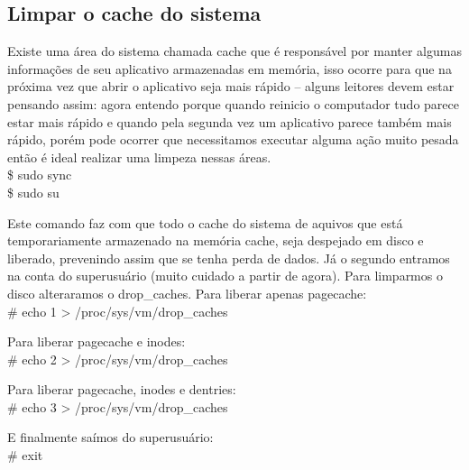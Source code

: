 \subsection{Limpar o cache do sistema}
Existe uma área do sistema chamada cache que é responsável por manter algumas informações de seu aplicativo armazenadas em memória, isso ocorre para que na próxima vez que abrir o aplicativo seja mais rápido – alguns leitores devem estar pensando assim: agora entendo porque quando reinicio o computador tudo parece estar mais rápido e quando pela segunda vez um aplicativo parece também mais rápido, porém pode ocorrer que necessitamos executar alguma ação muito pesada então é ideal realizar uma limpeza nessas áreas. \\
{\ttfamily\$ sudo sync \\
\$ sudo su}

Este comando faz com que todo o cache do sistema de aquivos que está temporariamente armazenado na memória cache, seja despejado em disco e liberado, prevenindo assim que se tenha perda de dados. Já o segundo entramos na conta do superusuário (muito cuidado a partir de agora). Para limparmos o disco alteraramos o drop\_caches. Para liberar apenas pagecache: \\
{\ttfamily\# echo 1 > /proc/sys/vm/drop\_caches}

Para liberar pagecache e inodes: \\
{\ttfamily\# echo 2 > /proc/sys/vm/drop\_caches}

Para liberar pagecache, inodes e dentries: \\
{\ttfamily\# echo 3 > /proc/sys/vm/drop\_caches}

E finalmente saímos do superusuário: \\
{\ttfamily\# exit}

\clearpage